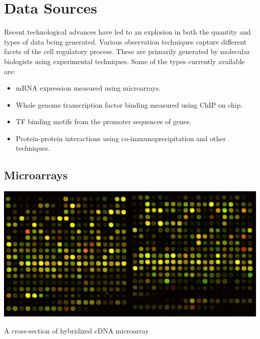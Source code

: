 \section{Data Sources}\label{bkg:datasources}
Recent technological advances have led to an explosion in both the quantity and types of data being generated. Various observation techniques capture different facets of the cell regulatory process. These are primarily generated by molecular biologists using experimental techniques. Some of the types currently available are:
\begin{itemize}
  \item \ac{mRNA} expression measured using microarrays. 
  \item Whole genome transcription factor binding measured using \ac{ChIP} on chip. 
  \item \ac{TF} binding motifs from the promoter sequences of genes. 
  \item Protein-protein interactions using co-immunoprecipitation and other techniques. 
\end{itemize}

\subsection{Microarrays}
\begin{floatingfigure}[p]{0.45\textwidth}
\includegraphics[scale=0.25]{introduction/cdnMicroarray.eps}
\caption{A cross-section of hybridized cDNA microarray}
\label{fig:microarray}
\end{floatingfigure}

